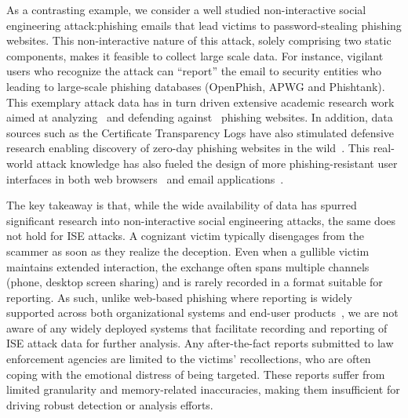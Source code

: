 As a contrasting example, we consider a well studied non-interactive social engineering attack:phishing emails that lead victims to password-stealing phishing websites. This non-interactive nature of this attack, solely comprising two static components, makes it feasible to collect large scale data. For instance, vigilant users who recognize the attack can ``report'' the email to security entities who leading to large-scale phishing databases (\eg OpenPhish, APWG and Phishtank). This exemplary attack data has in turn driven extensive academic research work aimed at analyzing~\cite{TianJ0Y018,PengXQ0VW19,OestZWNBZTDA20,crawlphish,SubramaniMSVP22,Sanchez-RolaBBB23,0004HK24,LimPK24,LeeLK0K25,LimLJ0KK25} and defending against~\cite{ZhangHC07,afroz2009phishzoo,AbdelnabiKF20,spartacus,LiHDLCOLH24} phishing websites. In addition, data sources such as the Certificate Transparency Logs have also stimulated defensive research enabling discovery of zero-day phishing websites in the wild~\cite{DrichelDBM21,KondrackiASN21,BijmansBSNW21,phishpedia,phishintention,dynaphish,phishllm,Teoh0LHD24}. This real-world attack knowledge has also fueled the design of more phishing-resistant user interfaces in both web browsers~\cite{EgelmanCH08,LinGTMA11,AkhaweF13,ThompsonSSWSF19,0002JW021} and email applications~\cite{Hu018,PetelkaZS19,cooper2021heads,YuAKWW23}. 


The key takeaway is that, while the wide availability of data has spurred significant research into non-interactive social engineering attacks, the same does not hold for ISE attacks. A cognizant victim typically disengages from the scammer as soon as they realize the deception. Even when a gullible victim maintains extended interaction, the exchange often spans multiple channels (\eg phone, desktop screen sharing) and is rarely recorded in a format suitable for reporting. As such, unlike web-based phishing where reporting is widely supported across both organizational systems and end-user products~\cite{LainKC22,KerstenBAZ22,pilavakis2023didn,MarinBZA23,doubly_dangerous}, we are not aware of any widely deployed systems that facilitate recording and reporting of ISE attack data for further analysis. Any after-the-fact reports submitted to law enforcement agencies are limited to the victims' recollections, who are often coping with the emotional distress of being targeted. These reports suffer from limited granularity and memory-related inaccuracies, making them insufficient for driving robust detection or analysis efforts.


